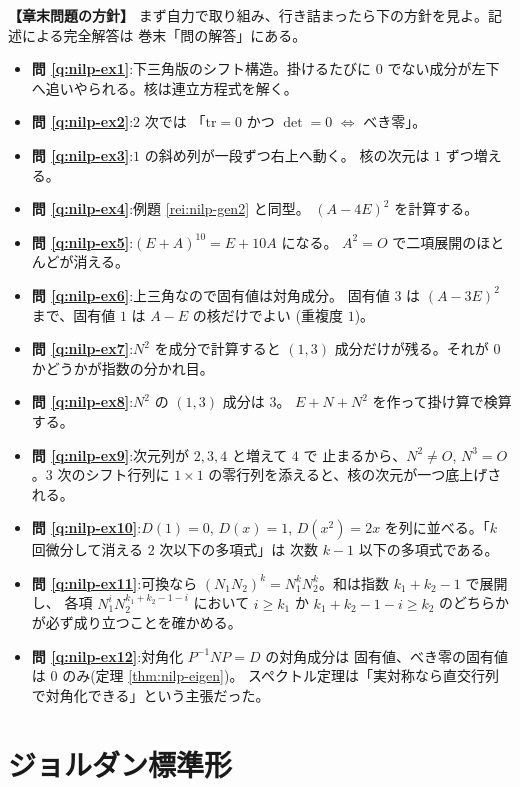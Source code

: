\bigskip
{\small
\noindent\textbf{【章末問題の方針】}\quad
まず自力で取り組み、行き詰まったら下の方針を見よ。記述による完全解答は
巻末「問の解答」にある。
\begin{itemize}
\item \textbf{問 \ref{q:nilp-ex1}}:下三角版のシフト構造。掛けるたびに
$0$ でない成分が左下へ追いやられる。核は連立方程式を解く。
\item \textbf{問 \ref{q:nilp-ex2}}:$2$ 次では
「$\mathrm{tr} = 0$ かつ $\det = 0$ $\iff$ べき零」。
\item \textbf{問 \ref{q:nilp-ex3}}:$1$ の斜め列が一段ずつ右上へ動く。
核の次元は $1$ ずつ増える。
\item \textbf{問 \ref{q:nilp-ex4}}:例題 \ref{rei:nilp-gen2} と同型。
$(A - 4E)^2$ を計算する。
\item \textbf{問 \ref{q:nilp-ex5}}:$(E + A)^{10} = E + 10A$ になる。
$A^2 = O$ で二項展開のほとんどが消える。
\item \textbf{問 \ref{q:nilp-ex6}}:上三角なので固有値は対角成分。
固有値 $3$ は $(A - 3E)^2$ まで、固有値 $1$ は $A - E$ の核だけでよい
(重複度 $1$)。
\item \textbf{問 \ref{q:nilp-ex7}}:$N^2$ を成分で計算すると
$(1, 3)$ 成分だけが残る。それが $0$ かどうかが指数の分かれ目。
\item \textbf{問 \ref{q:nilp-ex8}}:$N^2$ の $(1, 3)$ 成分は $3$。
$E + N + N^2$ を作って掛け算で検算する。
\item \textbf{問 \ref{q:nilp-ex9}}:次元列が $2, 3, 4$ と増えて $4$ で
止まるから、$N^2 \neq O$, $N^3 = O$。$3$ 次のシフト行列に
$1 \times 1$ の零行列を添えると、核の次元が一つ底上げされる。
\item \textbf{問 \ref{q:nilp-ex10}}:$D(1) = 0$, $D(x) = 1$,
$D(x^2) = 2x$ を列に並べる。「$k$ 回微分して消える $2$ 次以下の多項式」は
次数 $k - 1$ 以下の多項式である。
\item \textbf{問 \ref{q:nilp-ex11}}:可換なら
$(N_1 N_2)^k = N_1^k N_2^k$。和は指数 $k_1 + k_2 - 1$ で展開し、
各項 $N_1^i N_2^{k_1 + k_2 - 1 - i}$ において $i \ge k_1$ か
$k_1 + k_2 - 1 - i \ge k_2$ のどちらかが必ず成り立つことを確かめる。
\item \textbf{問 \ref{q:nilp-ex12}}:対角化 $P^{-1}NP = D$ の対角成分は
固有値、べき零の固有値は $0$ のみ(定理 \ref{thm:nilp-eigen})。
スペクトル定理は「実対称なら直交行列で対角化できる」という主張だった。
\end{itemize}
}

\chapter{ジョルダン標準形}\label{chap:jordan}

